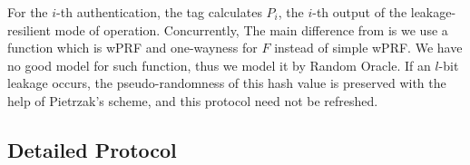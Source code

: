 \documentclass[english]{llncs}
\begin{document}
For the $i$-th authentication, the tag calculates $P_{i}$,
the $i$-th output of the leakage-resilient mode of operation. 
Concurrently,
The main difference from \cite{P09} is we use a function which is wPRF and one-wayness
for $F$ instead of simple wPRF.
We have no good model for such function, thus we model it by Random Oracle.
If an $l$-bit leakage occurs, the pseudo-randomness
of this hash value is preserved with the help of Pietrzak's scheme,
and this protocol need not be refreshed. %




\subsection{Detailed Protocol}
\end{document}
